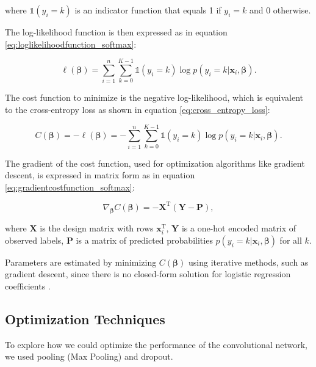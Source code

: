 where $\mathbb{1}(y_i = k)$ is an indicator function that equals 1 if $y_i = k$ and 0 otherwise.

The log-likelihood function is then expressed as in equation \ref{eq:loglikelihoodfunction_softmax}:

\begin{equation}
\ell(\boldsymbol{\beta}) = \sum_{i=1}^n \sum_{k=0}^{K-1} \mathbb{1}(y_i = k) \log p(y_i = k \vert \boldsymbol{x}_i, \boldsymbol{\beta}).
\label{eq:loglikelihoodfunction_softmax}
\end{equation}

The cost function to minimize is the negative log-likelihood, which is equivalent to the cross-entropy loss as shown in equation \ref{eq:cross_entropy_loss}:

\begin{equation}
C(\boldsymbol{\beta}) = -\ell(\boldsymbol{\beta}) = -\sum_{i=1}^n \sum_{k=0}^{K-1} \mathbb{1}(y_i = k) \log p(y_i = k \vert \boldsymbol{x}_i, \boldsymbol{\beta}).
\label{eq:cross_entropy_loss}
\end{equation}

The gradient of the cost function, used for optimization algorithms like gradient descent, is expressed in matrix form as in equation \ref{eq:gradientcostfunction_softmax}:

\begin{equation}
\nabla_{\boldsymbol{\beta}} C(\boldsymbol{\beta}) = -\mathbf{X}^\mathrm{T} (\mathbf{Y} - \mathbf{P}),
\label{eq:gradientcostfunction_softmax}
\end{equation}

where $\mathbf{X}$ is the design matrix with rows $\boldsymbol{x}_i^\mathrm{T}$, $\mathbf{Y}$ is a one-hot encoded matrix of observed labels, $\mathbf{P}$ is a matrix of predicted probabilities $p(y_i = k \vert \boldsymbol{x}_i, \boldsymbol{\beta})$ for all $k$.

Parameters are estimated by minimizing $C(\boldsymbol{\beta})$ using iterative methods, such as gradient descent, since there is no closed-form solution for logistic regression coefficients \cite{Hjorth-Jensen_MachineLearning_2023}.

\subsection{Optimization Techniques}
To explore how we could optimize the performance of the convolutional network, we used pooling (Max Pooling) and dropout.
